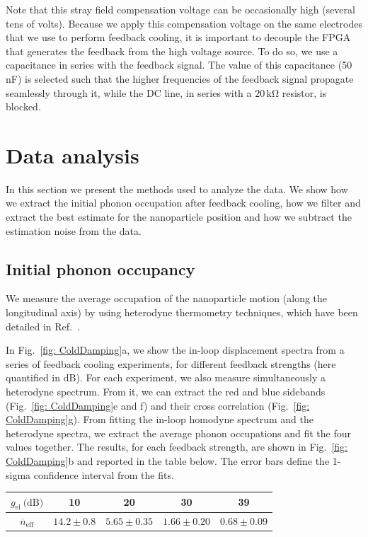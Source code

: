 \documentclass[aps, 
reprint, 
notitlepage,  superscriptaddress, 
onecolumn]{revtex4-1}
\newcommand{\<}{\langle}
\renewcommand{\>}{\rangle}
\begin{document}
Note that this stray field compensation voltage can be occasionally high (several tens of volts). Because we apply this compensation voltage on the same electrodes that we use to perform feedback cooling, it is important to decouple the FPGA that generates the feedback from the high voltage source. 
%
To do so, we use a capacitance in series with the feedback signal. The value of this capacitance (50 nF) is selected such that the higher frequencies of the feedback signal propagate seamlessly through it, while the DC line, in series with a $20\,\mathrm{k\Omega}$ resistor, is blocked. 

\clearpage
\newpage
\section{Data analysis}
In this section we present the methods used to analyze the data.
We show how we extract the initial phonon occupation after feedback cooling, how we filter and extract the best estimate for the nanoparticle position and how we subtract the estimation noise from the data.

\subsection{Initial phonon occupancy }
\label{sec: initial phonon occupancy}
We measure the average occupation of the nanoparticle motion (along the longitudinal axis) by using heterodyne thermometry techniques, which have been detailed in Ref.~\cite{tebbenjohanns_quantum_2021}.

In Fig.~\ref{fig: ColdDamping}a, we show the in-loop displacement spectra from a series of feedback cooling experiments, for different feedback strengths (here quantified in $\mathrm{dB}$).
%
For each experiment, we also measure simultaneously a heterodyne spectrum.
From it, we can extract the red and blue sidebands (Fig.~\ref{fig: ColdDamping}e and f) and their cross correlation (Fig.~\ref{fig: ColdDamping}g).
%
From fitting the in-loop homodyne spectrum and the heterodyne spectra, we extract the average phonon occupations and fit the four values together.
The results, for each feedback strength, are shown in Fig.~\ref{fig: ColdDamping}b and reported in the table below.
The error bars define the 1-sigma confidence interval from the fits.
%
\begin{center}
    \begin{tabular}{c|cccc}
    \hline
     $g_\text{el}~\text{(dB)}$  &  10 & 20 & 30 & 39\\
    \hline     
    $\overline{n}_\text{eff}$ & $14.2\pm 0.8$ & $5.65 \pm 0.35$ & $1.66\pm 0.20$ & $0.68 \pm 0.09$\\
    \hline     
    \end{tabular}
\end{center}
\end{document}
